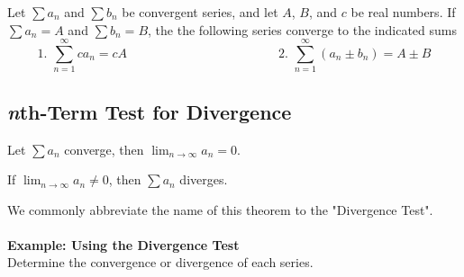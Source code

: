 \documentclass[addpoints, 12pt]{exam}
\begin{document}
\begin{tcolorbox}[title= PROPERTIES OF INFINITE SERIES,black,sharp corners,colback=white,colbacktitle=white,coltitle=black]

    Let $\displaystyle\sum a_n$ and $\displaystyle\sum b_n$ be convergent series, and let $A$, $B$, and $c$ be real numbers. If $\displaystyle\sum a_n=A$ and $\displaystyle\sum b_n=B$, the the following series converge to the indicated sums
    \[1.\, \, \sum_{n=1}^{\infty}ca_n=cA \hspace{2in}2.\, \, \sum_{n=1}^{\infty}\left(a_n\pm b_n\right)=A\pm B\]

\end{tcolorbox}

\newpage
{}
\subsection*{\textit{n}th-Term Test for Divergence}
\begin{tcolorbox}[title= LIMIT OF THE nTH TERM OF A SERIES,black,sharp corners,colback=white,colbacktitle=white,coltitle=black]

    \begin{center}
    Let $\displaystyle\sum a_n$ converge, then $\displaystyle\lim_{n\to\infty}a_n=0$.
    
    
    If $\displaystyle\lim_{n\to\infty}a_n\ne0$, then $\displaystyle\sum a_n$  diverges.
    \end{center}
    
\end{tcolorbox}
We commonly abbreviate the name of this theorem to the "Divergence Test".\\
\\
\noindent\textbf{Example: Using the Divergence Test}\\
Determine the convergence or divergence of each series.
\end{document}
